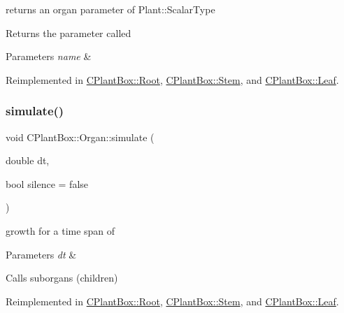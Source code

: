 returns an organ parameter of Plant\+::\+Scalar\+Type 

Returns the parameter called 
\begin{DoxyParams}{Parameters}
{\em name} & \\
\hline
\end{DoxyParams}


Reimplemented in \hyperlink{classCPlantBox_1_1Root_a23fac3d7c3b15e5f270d76b56c693ab9}{C\+Plant\+Box\+::\+Root}, \hyperlink{classCPlantBox_1_1Stem_ace47428771936118b0775ca9d23e5f4f}{C\+Plant\+Box\+::\+Stem}, and \hyperlink{classCPlantBox_1_1Leaf_a97bb6cc92a59f0d137eb6b497b5d376e}{C\+Plant\+Box\+::\+Leaf}.

\mbox{\label{classCPlantBox_1_1Organ_acf519fc6730c0adbb2a82b7702ff7a28}} 
\subsubsection{\texorpdfstring{simulate()}{simulate()}}
{\footnotesize\ttfamily void C\+Plant\+Box\+::\+Organ\+::simulate (\begin{DoxyParamCaption}\item[{double}]{dt,  }\item[{bool}]{silence = {\ttfamily false} }\end{DoxyParamCaption})\hspace{0.3cm}{\ttfamily [virtual]}}



growth for a time span of 


\begin{DoxyParams}{Parameters}
{\em dt} & \\
\hline
\end{DoxyParams}
Calls suborgans (children) 

Reimplemented in \hyperlink{classCPlantBox_1_1Root_af2fa9d229ab05897214e0ec224f0ae71}{C\+Plant\+Box\+::\+Root}, \hyperlink{classCPlantBox_1_1Stem_ad2f7f8607fe02dbe2f4d4335248cf90b}{C\+Plant\+Box\+::\+Stem}, and \hyperlink{classCPlantBox_1_1Leaf_ac8f35a92020107f44059b995e44af5d6}{C\+Plant\+Box\+::\+Leaf}.

\mbox{\label{classCPlantBox_1_1Organ_a9f823aebd19519096e899e65604f239f}} 
